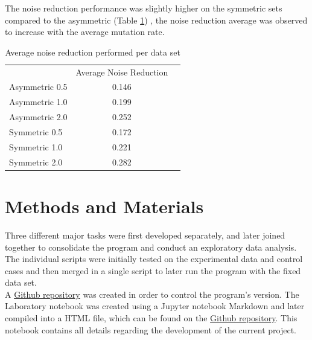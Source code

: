 \documentclass[12pt]{article}
\begin{document}
The noise reduction performance was slightly higher on the symmetric sets compared to the asymmetric (Table \ref{table:averg}) , the noise reduction average was observed to increase with the average mutation rate. 



\begin{table}[H]
	\centering
	\small\addtolength{\tabcolsep}{-2pt}
	\caption{Average noise reduction performed per data set}
	\begin{tabular}{l|c|l}
		\cline{2-2}
		\textbf{} & \multicolumn{1}{l|}{Average Noise Reduction} &  \\ \cline{1-2}
		\multicolumn{1}{|l|}{Asymmetric 0.5} & 0.146 &  \\ \cline{1-2}
		\multicolumn{1}{|l|}{Asymmetric 1.0} & 0.199 &  \\ \cline{1-2}
		\multicolumn{1}{|l|}{Asymmetric 2.0} & 0.252 &  \\ \cline{1-2}
		\multicolumn{1}{|l|}{Symmetric 0.5} & 0.172 &  \\ \cline{1-2}
		\multicolumn{1}{|l|}{Symmetric 1.0} & 0.221 &  \\ \cline{1-2}
		\multicolumn{1}{|l|}{Symmetric 2.0} & 0.282 &  \\ \cline{1-2}
	\end{tabular}

\label{table:averg}
\end{table}


\section{Methods and Materials}
Three different major tasks were first developed separately, and later joined together to consolidate the program and conduct an exploratory data analysis. The individual scripts were initially tested on the experimental data and control cases and then merged in a single script to later run the program with the fixed data set.\\

A \href{https://github.com/msarrias/protein_multial_noise_reduction}{Github repository} was created in order to control the program's version. The Laboratory notebook was created using a Jupyter notebook Markdown and later compiled into a HTML file, which can be found on the \href{https://github.com/msarrias/protein_multial_noise_reduction/tree/master/results}{Github repository}. This notebook contains all details regarding the development of the current project.\\
\end{document}
